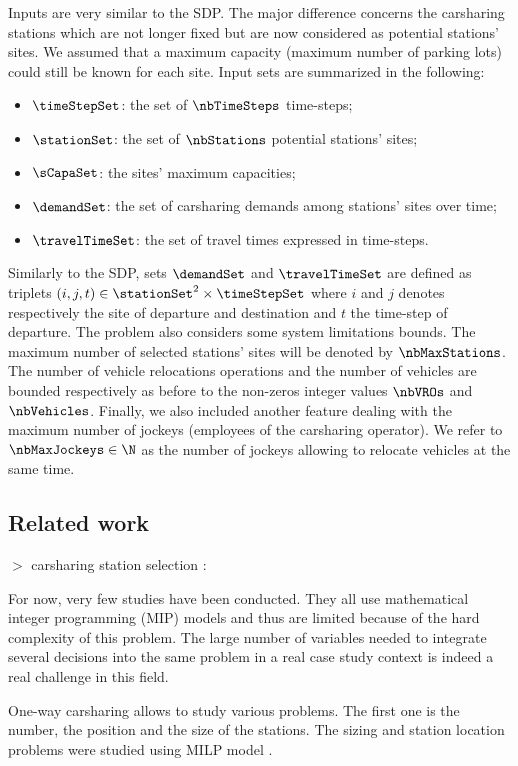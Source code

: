 \begin{bibunit}[ieeetr]
\bigbreak
Inputs are very similar to the SDP.
The major difference concerns the carsharing stations which are not longer fixed but are now considered as potential stations' sites.
We assumed that a maximum capacity (\ie maximum number of parking lots) could still be known for each site.
Input sets are summarized in the following:
\begin{itemize}
\item $\timeStepSet$: the set of $\nbTimeSteps$ time-steps;
\item $\stationSet$: the set of $\nbStations$ potential stations' sites;
\item $\sCapaSet$: the sites' maximum capacities;
\item $\demandSet$: the set of carsharing demands among stations' sites over time;
\item $\travelTimeSet$: the set of travel times expressed in time-steps.
\end{itemize}
Similarly to the SDP, sets $\demandSet$ and $\travelTimeSet$ are defined as triplets $(i,j,t) \in \stationSet^2 \times \timeStepSet$ where $i$ and $j$ denotes respectively the site of departure and destination and $t$ the time-step of departure.
The problem also considers some system limitations bounds.
The maximum number of selected stations' sites will be denoted by $\nbMaxStations$.
The number of vehicle relocations operations and the number of vehicles are bounded respectively as before to the non-zeros integer values $\nbVROs$ and $\nbVehicles$.
Finally, we also included another feature dealing with the maximum number of jockeys (employees of the carsharing operator).
We refer to $\nbMaxJockeys \in \N$ as the number of jockeys allowing to relocate vehicles at the same time.


\subsection{Related work}
$>$ carsharing station selection : \cite{ion_site_2009}

For now, very few studies have been conducted.
They all use mathematical integer programming (MIP) models and thus are limited because of the hard complexity of this problem.
The large number of variables needed to integrate several decisions into the same problem in a real case study context is indeed a real challenge in this field.



One-way carsharing allows to study various problems.
The first one is the number, the position and the size of the stations.
The sizing and station location problems were studied using MILP model \cite{rickenberg_decision_2013}.



\end{bibunit}

